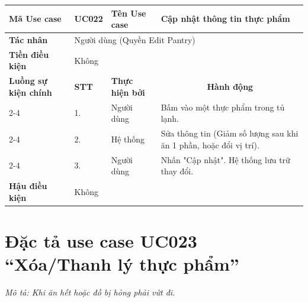 \begin{longtable}{|p{2.7cm}|p{0.8cm}|p{2.6cm}|p{7.3cm}|}
\hline
\cellcolor[HTML]{D5F5E3}\textbf{Mã Use case} & \multicolumn{1}{l|}{UC022} & \cellcolor[HTML]{D5F5E3}\textbf{Tên Use case} & Cập nhật thông tin thực phẩm \\ \hline
\cellcolor[HTML]{D5F5E3}\textbf{Tác nhân} & \multicolumn{3}{p{10.7cm}|}{Người dùng (Quyền Edit Pantry)} \\ \hline
\cellcolor[HTML]{D5F5E3}\textbf{Tiền điều kiện} & \multicolumn{3}{p{10.7cm}|}{Không} \\ \hline

\cellcolor[HTML]{D5F5E3}\textbf{Luồng sự kiện chính} & \cellcolor[HTML]{FDEBD0}\textbf{STT} & \cellcolor[HTML]{FDEBD0}\textbf{Thực hiện bởi} & \multicolumn{1}{c|}{\cellcolor[HTML]{FDEBD0}\textbf{Hành động}} \\ \cline{2-4} 
\cellcolor[HTML]{D5F5E3} & 1. & Người dùng & Bấm vào một thực phẩm trong tủ lạnh. \\ \cline{2-4} 
\cellcolor[HTML]{D5F5E3} & 2. & Hệ thống & Sửa thông tin (Giảm số lượng sau khi ăn 1 phần, hoặc đổi vị trí). \\ \cline{2-4} 
\cellcolor[HTML]{D5F5E3} & 3. & Người dùng & Nhấn "Cập nhật". Hệ thống lưu trữ thay đổi. \\ \hline

\cellcolor[HTML]{D5F5E3}\textbf{Hậu điều kiện} & \multicolumn{3}{p{10.7cm}|}{Không} \\ \hline
\end{longtable}
\endgroup

\section{Đặc tả use case UC023 ``Xóa/Thanh lý thực phẩm''}
\textit{Mô tả: Khi ăn hết hoặc đồ bị hỏng phải vứt đi.}
\vspace{0.5cm}

\begingroup
\renewcommand{\arraystretch}{1.5}


